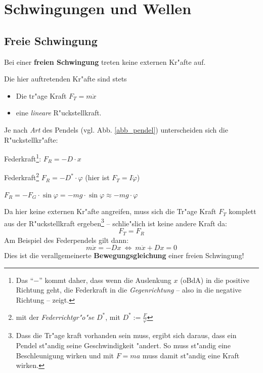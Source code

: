 \chapter{Schwingungen und Wellen}
\label{kap_schwingungen-und-wellen}




\section{Freie Schwingung}
\label{kap_freie-schwingung}

\begin{Def}
    Bei einer \textbf{freien
     Schwingung} treten keine externen Kr"afte auf.
\end{Def}

Die hier auftretenden Kr"afte sind stets
\begin{itemize}
\item Die tr"age Kraft $F_T = m \ddot x$
\item eine \emph{lineare} R"uckstellkraft.
\end{itemize}
Je nach \emph{Art} des Pendels (vgl. Abb. \ref{abb_pendel}) unterscheiden sich die R"uckstellkr"afte:
\begin{description}[\setlabelstyle{\bfseries\slshape}]
\item[\index{Federpendel}Federpendel] Federkraft\footnote{Das "`$-$"'
     kommt daher, dass wenn die Auslenkung $x$ (oBdA) in die positive
     Richtung geht, die Federkraft in die \emph{Gegenrichtung} -- also
     in die negative Richtung -- zeigt.}: $F_R = - D \cdot x$
\item[\index{Torsionspendel}Torsionspendel] Federkraft\footnote{mit
     der \emph{Federrichtgr"o"se} $D^*$, mit $D^* :=
     \frac{F}{\varphi}$} $F_R = -D^* \cdot \varphi$ (hier ist $F_T = I
   \ddot \varphi$)
\item[\index{Fadenpendel}Fadenpendel] $F_R = -F_G \cdot \sin \varphi =
   -mg \cdot \sin \varphi \approx -mg \cdot \varphi$
\end{description}

Da hier keine externen Kr"afte angreifen, muss sich die Tr"age Kraft
$F_T$ komplett aus der R"uckstellkraft ergeben\footnote{Dass die Tr"age
  kraft vorhanden sein muss, ergibt sich daraus, dass ein Pendel
  st"andig seine Geschwindigkeit "andert. So muss st"andig eine
  Beschleunigung wirken und mit $F = ma$ muss damit st"andig eine Kraft
  wirken.} -- schlie"slich ist keine andere Kraft da:
\begin{equation}
   \label{eq:101}
   F_T = F_R
\end{equation}
Am Beispiel des Federpendels gilt dann:
\begin{equation}
   \label{eqn_freie-schwingung}
   m\ddot x = - D x ~ \Leftrightarrow ~ \boxed{m\ddot x + Dx = 0}
\end{equation}
Dies ist die verallgemeinerte \textbf{Bewegungsgleichung} einer freien
Schwingung!

